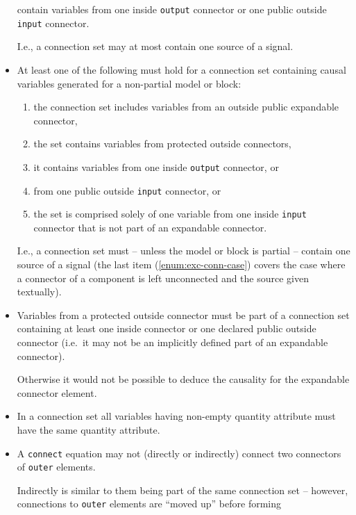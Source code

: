 \begin{itemize}
  contain variables from one inside \lstinline!output! connector or one public
  outside \lstinline!input! connector.
  \begin{nonnormative}
  I.e., a connection set may at most contain one source of a signal.
  \end{nonnormative}
\item
  At least one of the following must hold for a connection set
  containing causal variables generated for a non-partial model or
  block:
\begin{enumerate}
\item the connection set includes variables from an outside public
  expandable connector,
\item the set contains variables from protected
  outside connectors,
\item it contains variables from one inside \lstinline!output!
  connector, or
\item from one public outside \lstinline!input! connector, or
\item the  set is comprised solely of one variable from one inside \lstinline!input!
  connector that is not part of an expandable connector. \label{enum:exc-conn-case}
\end{enumerate}
\begin{nonnormative}
I.e., a connection set must -- unless the model or block is partial -- contain one source of a signal (the last item (\autoref{enum:exc-conn-case})
covers the case where a connector of a component is left unconnected and the source given textually).
\end{nonnormative}
\item
  Variables from a protected outside connector must be part of a
  connection set containing at least one inside connector or one
  declared public outside connector (i.e.\ it may not be an implicitly
  defined part of an expandable connector).
  \begin{nonnormative}
  Otherwise it would not be possible to deduce the causality for the expandable connector element.
  \end{nonnormative}
\item
  In a connection set all variables having non-empty quantity attribute
  must have the same quantity attribute.
\item
  A \lstinline!connect! equation may not (directly or indirectly) connect two
  connectors of \lstinline!outer! elements.
  \begin{nonnormative}
  Indirectly is similar to them being part of the same connection set -- however, connections to \lstinline!outer! elements are ``moved up'' before forming

\end{nonnormative}
\end{itemize}
